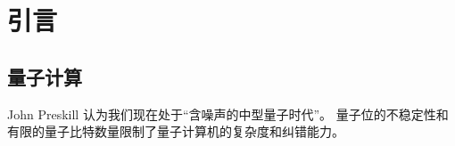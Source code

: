 \chapter{引言}

\section{量子计算}

John Preskill 认为我们现在处于“含噪声的中型量子时代”。\cite{preskill2018}
量子位的不稳定性和有限的量子比特数量限制了量子计算机的复杂度和纠错能力。
